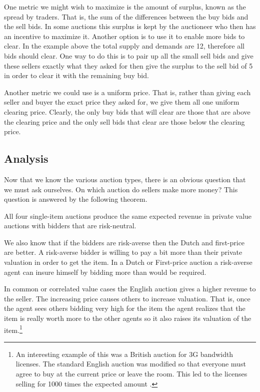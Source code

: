 One metric we might wish to maximize is the amount of surplus, known
as the spread by traders. That is, the sum of the differences between
the buy bids and the sell bids. In some auctions this surplus is kept
by the auctioneer who then has an incentive to maximize it. Another
option is to use it to enable more bids to clear.  In the example
above the total supply and demands are 12, therefore all bids should
clear. One way to do this is to pair up all the small sell bids and
give these sellers exactly what they asked for then give the surplus
to the sell bid of 5 in order to clear it with the remaining buy bid.

Another metric we could use is a uniform price. That is, rather than
giving each seller and buyer the exact price they asked for, we give
them all one uniform clearing price. Clearly, the only buy bids that
will clear are those that are above the clearing price and the only
sell bids that clear are those below the clearing price.

\subsection{Analysis}

Now that we know the various auction types, there is an obvious
question that we must ask ourselves. On which auction do sellers make
more money? This question is answered by the following theorem.

\begin{theorem}
  \label{th:revenue-eq}
  All four single-item auctions produce the same expected revenue in
  private value auctions with bidders that are risk-neutral.
\end{theorem}

We also know that if the bidders are risk-averse then the Dutch and
first-price are better.  A risk-averse bidder is willing to pay a bit
more than their private valuation in order to get the item. In a Dutch
or First-price auction a risk-averse agent can insure himself by
bidding more than would be required.

In common or correlated value cases the English auction gives a higher
revenue to the seller.  The increasing price causes others to increase
valuation.  That is, once the agent sees others bidding very high for
the item the agent realizes that the item is really worth more to the
other agents so it also raises its valuation of the item.\footnote{An
  interesting example of this was a British auction for 3G bandwidth
  licenses. The standard English auction was modified so that everyone
  must agree to buy at the current price or leave the room. This led
  to the licenses selling for 1000 times the expected amount
  \cite{harford05a}.}
\medskip

